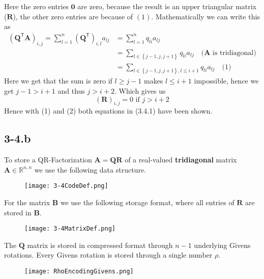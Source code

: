 \documentclass{article}
\begin{document}
Here the zero entries $\mathbf{0}$ are zero, because the result is an upper triangular matrix ($\mathbf{R}$), the other zero entries are because of $(1)$. Mathematically we can write this as
\begin{align*}
\left(\mathbf{Q}^{\mathsf{T}}\mathbf{A}\right)_{i,j} = \sum_{l=1}^{n}\left(\mathbf{Q}^{\mathsf{T}}\right)_{i,l}a_{lj} &= \sum_{l=1}^{n}q_{li}a_{lj} \\
&= \sum_{l \in \left\{j-1,j,j+1\right\}}q_{li}a_{lj} \quad \text{($\mathbf{A}$ is tridiagonal)} \\
&= \sum_{l \in \left\{j-1,j,j+1\right\}, l \leq i + 1}q_{li}a_{lj} \quad \text{(1)}
\end{align*}
Here we get that the sum is zero if $l \geq j - 1$ makes $l \leq i +1$ impossible, hence we get $j - 1 > i + 1$ and thus $j > i + 2$. Which gives us
\begin{equation}
    \left(\mathbf{R}\right)_{i,j} = 0 \text{ if } j > i + 2
\end{equation} 
Hence with (1) and (2) both equations in (3.4.1) have been shown.

\pagebreak

\subsection*{3-4.b}

\noindent To store a QR-Factorization $\mathbf{A} = \mathbf{Q}\mathbf{R}$ of a real-valued \textbf{tridiagonal} matrix $\mathbf{A}\in \mathbb{R}^{n,n}$ we use the following data structure.

\begin{figure}[!hbt]
    \centering
\texttt{[image: 3-4CodeDef.png]}
\end{figure}

\noindent For the matrix $\mathbf{B}$ we use the following storage format, where all entries of $\mathbf{R}$ are stored in $\mathbf{B}$.
\begin{figure}[!hbt]
    \centering
\texttt{[image: 3-4MatrixDef.png]}
\end{figure}

\noindent The $\mathbf{Q}$ matrix is stored in compressed format through $n-1$ underlying Givens rotations. Every Givens rotation is stored through a single number $\rho$.
\begin{figure}[!hbt]
    \centering
\texttt{[image: RhoEncodingGivens.png]}
\end{figure}
\end{document}
